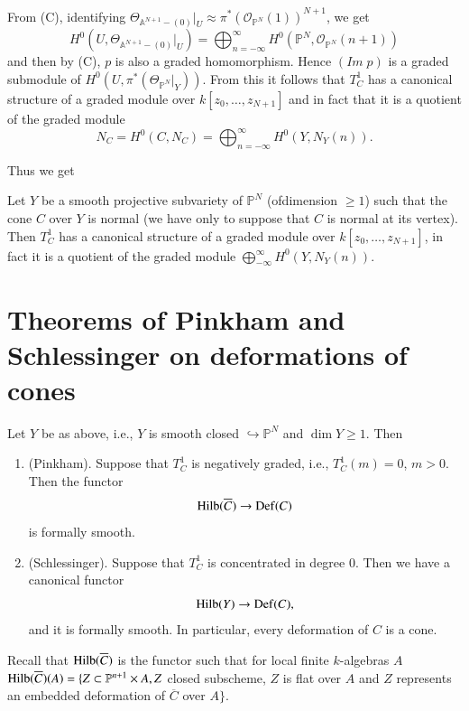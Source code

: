 {From (C), identifying $\Theta_{\mathbb{A}^{N+1}-(0)}|_{U}\approx
\pi^{\ast}(\mathscr{O}_{\mathbb{P}^{N}}(1))^{N+1}$, we get
$$
H^{0}(U,\Theta_{\mathbb{A}^{N+1}-(0)}|_{U})=\bigoplus^{\infty}_{n=-\infty}H^{0}(\mathbb{P}^{N},\mathscr{O}_{\mathbb{P}^{N}}(n+1))
$$
and then by (C), $p$ is also a graded homomorphism. Hence $(Im \; p)$ is
a graded submodule of
$H^{0}(U,\pi^{\ast}(\Theta_{\mathbb{P}^{N}}|_{Y}))$. From this it
follows that $T^{1}_{C}$ has a canonical structure of a graded module
over $k[z_{0},\ldots,z_{N+1}]$ and in fact that it is a quotient of
the graded module
$$
N_{C}=H^{0}(C,N_{C})=\bigoplus^{\infty}_{n=-\infty}H^{0}(Y,N_{Y}(n)).
$$

Thus we get
\begin{proposition}\label{part1-prop11.1}
Let $Y$ be a smooth projective subvariety of $\mathbb{P}^{N}$
(of\pageoriginale dimension $\geq 1$) such that the cone $C$ over $Y$
is normal (we have only to suppose that $C$ is normal at its
vertex). Then $T^{1}_{C}$ has a canonical structure of a graded module
over $k[z_{0},\ldots,z_{N+1}]$, in fact it is a quotient of the graded
module $\bigoplus\limits^{\infty}_{-\infty}H^{0}(Y,N_{Y}(n))$.
\end{proposition}

\section[Theorems of
  Pinkham and Schlessinger on...]{Theorems of
  Pinkham and Schlessinger on deformations of cones}\label{part1-sec12} 

\begin{theorem}\label{part1-thm12.1}
Let $Y$ be as above, i.e., $Y$ is smooth closed $\hookrightarrow
\mathbb{P}^{N}$ and $\dim Y\geq 1$. Then
\begin{enumerate}
\renewcommand{\labelenumi}{\rm(\theenumi)}
\item (Pinkham). Suppose that $T^{1}_{C}$ is negatively graded, i.e.,
  $T^{1}_{C}(m)=0$, $m>0$. Then the functor
$$
\operatorname{Hilb} (\overline{C})\to \operatorname{Def}(C)
$$
is formally smooth.

\item (Schlessinger). Suppose that $T^{1}_{C}$ is concentrated in
  degree $0$. Then we have a canonical functor
$$
\operatorname{Hilb}(Y)\to \operatorname{Def}(C),
$$
and it is formally smooth. In particular, every deformation of $C$ is
a cone.
\end{enumerate}

Recall that $\operatorname{Hilb}(\overline{C})$ is the functor such that for local
finite $k$-algebras $A$ $\operatorname{Hilb}(\overline{C})(A)=\{Z\subset
\mathbb{P}^{n+1}\times A,Z$ closed subscheme, $Z$ is flat over $A$ and
$Z$ represents an embedded deformation of $\overline{C}$ over $A\}$.
\end{theorem}

}
